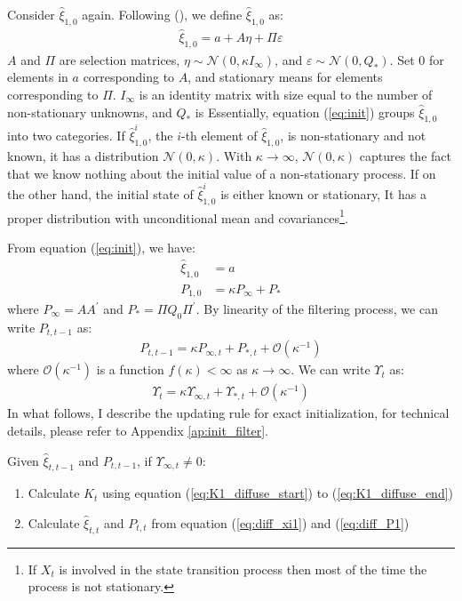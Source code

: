 \documentclass[12pt]{article}
\newenvironment{boenumerate}
    {\begin{enumerate}\renewcommand\labelenumi{\textbf\theenumi}}
    {\end{enumerate}}
\numberwithin{equation}{section}
\begin{document}
Consider $\hat{\xi}_{1,0}$ again. Following (\cite{koopman_1997}), we define $\hat{\xi}_{1,0}$ as:
\begin{align}
    \hat{\xi}_{1,0} = a + A\eta + \Pi\varepsilon \label{eq:init}
\end{align}
$A$ and $\Pi$ are selection matrices, $\eta\sim\mathcal{N}(0,\kappa I_{\infty})$, and $\varepsilon\sim\mathcal{N}(0,Q_{*})$. Set $0$ for elements in $a$ corresponding to $A$, and stationary means for elements corresponding to $\Pi$. $I_{\infty}$ is an identity matrix with size equal to the number of non-stationary unknowns, and $Q_{*}$ is Essentially, equation (\ref{eq:init}) groups $\hat{\xi}_{1,0}$ into two categories. If $\hat{\xi}_{1,0}^i$, the $i$-th element of $\hat{\xi}_{1,0}$, is non-stationary and not known, it has a distribution $\mathcal{N}(0, \kappa)$. With $\kappa\rightarrow\infty$, $\mathcal{N}(0,\kappa)$ captures the fact that we know nothing about the initial value of a non-stationary process. If on the other hand, the initial state of $\hat{\xi}_{1,0}^i$ is either known or stationary, It has a proper distribution with unconditional mean and covariances\footnote{If $X_t$ is involved in the state transition process then most of the time the process is not stationary.}. 

From equation (\ref{eq:init}), we have:
\begin{align}
    \hat{\xi}_{1,0} &= a  \label{eq:init_xi}\\
    P_{1,0} &= \kappa P_{\infty} + P_{*} \label{eq:init_P}
\end{align}
where $P_{\infty}=AA^{'}$ and $P_{*}=\Pi Q_0 \Pi^{'}$. By linearity of the filtering process, we can write $P_{t,t-1}$ as:
\begin{align}
    P_{t,t-1} = \kappa P_{\infty,t} + P_{*,t} + \mathcal{O}(\kappa^{-1}) \label{eq:P_diffuse}
\end{align}
where $\mathcal{O}(\kappa^{-1})$ is a function $f(\kappa)<\infty$ as $\kappa\rightarrow\infty$. We can write $\Upsilon_{t}$ as:
\begin{align*}
    \Upsilon_t = \kappa\Upsilon_{\infty,t} + \Upsilon_{*,t} + \mathcal{O}(\kappa^{-1})
\end{align*}
In what follows, I describe the updating rule for exact initialization, for technical details, please refer to Appendix \ref{ap:init_filter}.

Given $\hat{\xi}_{t,t-1}$ and $P_{t,t-1}$, if $\Upsilon_{\infty,t}\neq 0$:
\begin{boenumerate}
    \item Calculate $K_t$ using equation (\ref{eq:K1_diffuse_start}) to (\ref{eq:K1_diffuse_end})
    \item Calculate $\hat{\xi}_{t,t}$ and $P_{t,t}$ from equation (\ref{eq:diff_xi1}) and (\ref{eq:diff_P1})
\end{boenumerate}
\end{document}
